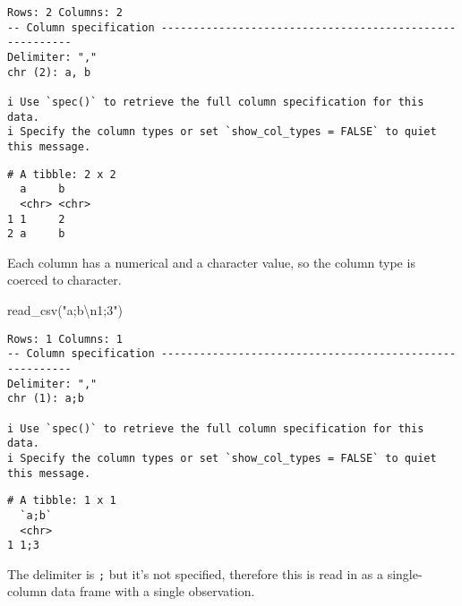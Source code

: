 \documentclass[
  letterpaper,
  DIV=11,
  numbers=noendperiod]{scrreprt}
\newenvironment{Shaded}{\begin{snugshade}}{\end{snugshade}}
\newcommand{\FunctionTok}[1]{\textcolor[rgb]{0.28,0.35,0.67}{#1}}
\newcommand{\NormalTok}[1]{\textcolor[rgb]{0.00,0.23,0.31}{#1}}
\newcommand{\SpecialCharTok}[1]{\textcolor[rgb]{0.37,0.37,0.37}{#1}}
\newcommand{\StringTok}[1]{\textcolor[rgb]{0.13,0.47,0.30}{#1}}
\begin{document}
\begin{enumerate}
\begin{tcolorbox}
\begin{verbatim}
Rows: 2 Columns: 2
-- Column specification --------------------------------------------------------
Delimiter: ","
chr (2): a, b

i Use `spec()` to retrieve the full column specification for this data.
i Specify the column types or set `show_col_types = FALSE` to quiet this message.
\end{verbatim}

\begin{verbatim}
# A tibble: 2 x 2
  a     b    
  <chr> <chr>
1 1     2    
2 a     b    
\end{verbatim}

  Each column has a numerical and a character value, so the column type
  is coerced to character.

  \end{tcolorbox}

  \begin{tcolorbox}[enhanced jigsaw, breakable, bottomtitle=1mm, left=2mm, colback=white, toprule=.15mm, leftrule=.75mm, colframe=quarto-callout-note-color-frame, colbacktitle=quarto-callout-note-color!10!white, title={Answer}, coltitle=black, toptitle=1mm, bottomrule=.15mm, opacitybacktitle=0.6, arc=.35mm, rightrule=.15mm, titlerule=0mm, opacityback=0]

\begin{Shaded}
\begin{Highlighting}[]
\FunctionTok{read\_csv}\NormalTok{(}\StringTok{"a;b}\SpecialCharTok{\textbackslash{}n}\StringTok{1;3"}\NormalTok{)}
\end{Highlighting}
\end{Shaded}

\begin{verbatim}
Rows: 1 Columns: 1
-- Column specification --------------------------------------------------------
Delimiter: ","
chr (1): a;b

i Use `spec()` to retrieve the full column specification for this data.
i Specify the column types or set `show_col_types = FALSE` to quiet this message.
\end{verbatim}

\begin{verbatim}
# A tibble: 1 x 1
  `a;b`
  <chr>
1 1;3  
\end{verbatim}

  The delimiter is \texttt{;} but it's not specified, therefore this is
  read in as a single-column data frame with a single observation.


\end{tcolorbox}
\end{enumerate}
\end{document}
